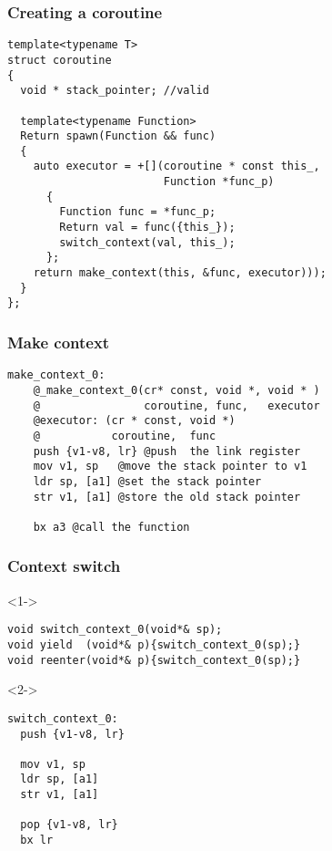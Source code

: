 \documentclass{beamer}
\begin{document}
\begin{frame}[fragile]
\frametitle{Creating a coroutine}

\begin{block}{}
\begin{lstlisting}[basicstyle=\small]
template<typename T>
struct coroutine
{
  void * stack_pointer; //valid
  
  template<typename Function>
  Return spawn(Function && func)
  {
    auto executor = +[](coroutine * const this_, 
                        Function *func_p)
      {
        Function func = *func_p;
        Return val = func({this_});
        switch_context(val, this_);
      };
    return make_context(this, &func, executor)));
  }
};
\end{lstlisting}
\end{block}
\end{frame}


\begin{frame}[fragile]
\frametitle{Make context}

\begin{block}{}
\begin{lstlisting}[language=ASM, basicstyle=\small]
make_context_0:
    @_make_context_0(cr* const, void *, void * )
    @                coroutine, func,   executor
    @executor: (cr * const, void *)
    @           coroutine,  func
    push {v1-v8, lr} @push  the link register
    mov v1, sp   @move the stack pointer to v1
    ldr sp, [a1] @set the stack pointer
    str v1, [a1] @store the old stack pointer

    bx a3 @call the function

\end{lstlisting}
\end{block}
\end{frame}




\begin{frame}[fragile]
\frametitle{Context switch}
\begin{block}<1->{}
\begin{lstlisting}
void switch_context_0(void*& sp);
void yield  (void*& p){switch_context_0(sp);}
void reenter(void*& p){switch_context_0(sp);}

\end{lstlisting}
\end{block}

\begin{block}<2->{}
\begin{lstlisting}[language=ASM]
switch_context_0:
  push {v1-v8, lr}

  mov v1, sp
  ldr sp, [a1]
  str v1, [a1]

  pop {v1-v8, lr}
  bx lr
\end{lstlisting}
\end{block}
\end{frame}
\end{document}
